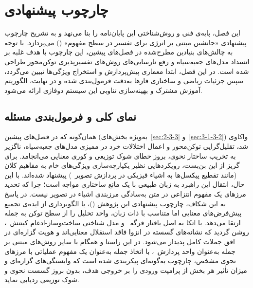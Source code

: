 
\chapter{چارچوب پیشنهادی}\label{chap:chapter4_methodology}

این فصل، پایه‌ی فنی و روش‌شناختی این پایان‌نامه را بنا می‌نهد و به تشریح چارچوب پیشنهادی «جانشین مبتنی بر انرژی برای تفسیر در سطح مفهوم» () می‌پردازد. با توجه به چالش‌های بنیادین مطرح‌شده در فصل‌های پیشین، این چارچوب با هدف غلبه بر انسداد مدل‌های جعبه‌سیاه و رفع نارسایی‌های روش‌های تفسیرپذیری توکن‌محور طراحی شده است. در این فصل، ابتدا معماری پیش‌پردازش و استخراج ویژگی‌ها تبیین می‌گردد، سپس جزئیات ریاضی و ساختاری فازها به‌دقت فرمول‌بندی شده و در نهایت، الگوریتم آموزش مشترک و بهینه‌سازی تناوبی این سیستم دوفازی ارائه می‌شود.



\section{نمای کلی و فرمول‌بندی مسئله}\label{sec:4-1}

همان‌گونه که در فصل‌های پیشین (به‌ویژه بخش‌های~\ref{sec:2-3-3} و~\ref{sec:3-1-3-2}) واکاوی شد، تقلیل‌گرایی توکن‌محور و اعمال اختلالات خرد در ممیزی مدل‌های جعبه‌سیاه، ناگزیر به تخریب ساختار نحوی، بروز خطای شوک توزیعی و کوری معنایی می‌انجامد. برای گریز از این بن‌بست، رویکردهایی نظیر یکپارچه‌سازی ویژگی‌های خام به مفاهیم کلان (مانند تقطیع پیکسل‌ها به اشیاء فیزیکی در پردازش تصویر~\cite{cafagna2023interpreting}) پیشنهاد شده‌اند. با این حال، انتقال این راهبرد به زبان طبیعی با یک مانع ساختاری مواجه است؛ چرا که تحدید مرزهای یک مفهوم انتزاعی در متن به‌سادگی مرزبندی اشیاء در تصویر نیست. در پاسخ به این شکاف، چارچوب پیشنهادی این پژوهش ()، با الگوبرداری از ایده‌ی تجمیع پیش‌فرض‌های معنایی اما متناسب با ذات زبان، واحد تحلیل را از سطح توکن به جمله ارتقا می‌دهد. با اتکا به اصل بافتار فرگه~\cite{frege1991foundations} و مدل شناختی ساخت‌وساز-ادغام کینتش~\cite{kintsch1998comprehension}، روشن گردید که نشانه‌های گسسته در انزوا فاقد استقلال معنایی‌اند و هویت گزاره‌ای در افق جملات کامل پدیدار می‌شود. در این راستا و همگام با سایر روش‌های مبتنی بر جمله به‌عنوان واحد پردازش~\cite{lcmteam2024lcm, enouen2024textgenshap, wang2023prompting}، با اتخاذ جمله به‌عنوان یک مفهوم عملیاتی با مرزهای نحوی مشخص، چارچوب  به‌گونه‌ای پیکربندی شده است که وابستگی‌های گزاره‌ای و میزان تأثیر هر بخش از پرامپت ورودی را بر خروجی هدف، بدون بروز گسست نحوی و شوک توزیعی ردیابی نماید.

